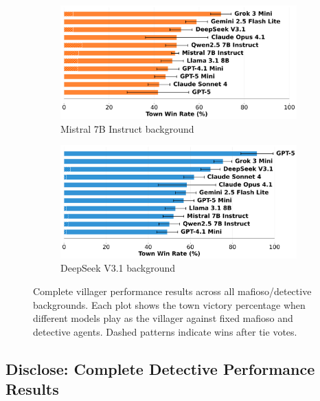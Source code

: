 \documentclass{article}
\begin{document}
\begin{figure}[htbp]
    \begin{subfigure}[b]{0.48\textwidth}
        \centering
        \includegraphics[width=\textwidth]{../results/villager_mistral_7b_instruct_db_benchmark.png}
        \caption{Mistral 7B Instruct background}
        \label{fig:villager_mistral_appendix}
    \end{subfigure}
    \hfill
    \begin{subfigure}[b]{0.48\textwidth}
        \centering
        \includegraphics[width=\textwidth]{../results/villager_deepseek_v3.1_db_benchmark.png}
        \caption{DeepSeek V3.1 background}
        \label{fig:villager_deepseek_appendix}
    \end{subfigure}
    \caption{Complete villager performance results across all mafioso/detective backgrounds. Each plot shows the town victory percentage when different models play as the villager against fixed mafioso and detective agents. Dashed patterns indicate wins after tie votes.}
    \label{fig:villager_complete}
\end{figure}

\subsection{Disclose: Complete Detective Performance Results}
\end{document}
